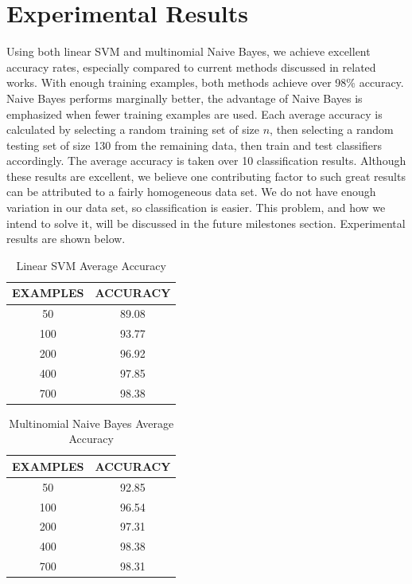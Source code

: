 \documentclass{article} %
\begin{document}
\section{Experimental Results}
Using both linear SVM and multinomial Naive Bayes, we achieve excellent accuracy rates, especially compared to
current methods discussed in related works. With enough training examples, both methods achieve over 98\% accuracy. 
Naive Bayes performs marginally better, the advantage of Naive Bayes is emphasized when fewer training examples
are used. Each average accuracy is calculated by selecting a random training set of size $n$, then selecting a
random testing set of size 130 from the remaining data, then train and test classifiers accordingly. The average
accuracy is taken over 10 classification results. Although these results are excellent, we believe one contributing
factor to such great results can be attributed to a fairly homogeneous data set. We do not have enough variation
in our data set, so classification is easier. This problem, and how we intend to solve it, will be discussed
in the future milestones section. Experimental results are shown below.


\begin{table}[hp]
\caption{Linear SVM Average Accuracy}
\begin{center}
\begin{tabular}{c|c}
{\bf EXAMPLES}  &{\bf ACCURACY}
\\ \hline
50              &89.08 \\
100             &93.77 \\
200             &96.92 \\
400             &97.85 \\
700             &98.38 \\
\end{tabular}
\end{center}
\end{table}

\begin{table}[hp]
\caption{Multinomial Naive Bayes Average Accuracy}
\begin{center}
\begin{tabular}{c|c}
{\bf EXAMPLES}  &{\bf ACCURACY}
\\ \hline 
50              &92.85 \\
100             &96.54 \\
200             &97.31 \\
400             &98.38 \\
700             &98.31 \\
\end{tabular}
\end{center}
\end{table}
\end{document}
